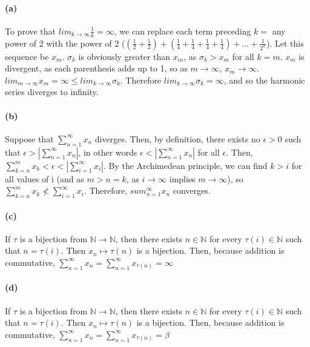 \documentclass[10pt,letter]{article}
\begin{document}
\paragraph{(a)} 
To prove that $lim_{k\rightarrow\infty}\frac{1}{k} = \infty$, we can replace each term preceding $k =$ any power of 2 with the power of 2 ($(\frac{1}{2} + \frac{1}{2}) + (\frac{1}{4} + \frac{1}{4} + \frac{1}{4} + \frac{1}{4}) + ... + \frac{1}{2^n}$). Let this sequence be $x_m$. $\sigma_k$ is obviously greater than $x_m$, as $\sigma_k > x_m$ for all $k = m$. $x_m$ is divergent, as each parenthesis adds up to 1, so as $m \rightarrow \infty$, $x_m \rightarrow \infty$. $lim_{m\rightarrow\infty}x_m = \infty \leq lim_{k\rightarrow\infty}\sigma_k$. Therefore $lim_{k\rightarrow\infty}\sigma_k = \infty$, and so the harmonic series diverges to infinity. 

\paragraph{(b)} Suppose that $\sum_{n=1}^\infty x_n$ diverges. Then, by definition, there exists no $\epsilon > 0$ such that $\epsilon > |\sum_{n=1}^\infty x_n|$, in other words $\epsilon < |\sum_{n=1}^\infty x_n|$ for all $\epsilon$. Then, $\sum_{k=n}^m x_k < \epsilon < |\sum_{i=1}^\infty x_i|$. By the Archimedean principle, we can find $k > i$ for all values of i (and as $m > n = k$, as $i \rightarrow\infty$ implies $m \rightarrow \infty$), so $\sum_{k=n}^m x_k \nless \sum_{i=1}^\infty x_i$. Therefore, $sum_{n=1}^\infty x_n$ converges. 

\paragraph{(c)} If $\tau$ is a bijection from $\mathbb{N} \rightarrow \mathbb{N}$, then there exists $n \in \mathbb{N}$ for every $\tau(i) \in \mathbb{N}$ such that $n = \tau(i)$. Then $x_n \mapsto \tau(n)$ is a bijection. Then, because addition is commutative, $\sum_{n=1}^\infty x_n = \sum_{n=1}^\infty x_{\tau(n)} = \infty$

\paragraph{(d)}  If $\tau$ is a bijection from $\mathbb{N} \rightarrow \mathbb{N}$, then there exists $n \in \mathbb{N}$ for every $\tau(i) \in \mathbb{N}$ such that $n = \tau(i)$. Then $x_n \mapsto \tau(n)$ is a bijection. Then, because addition is commutative, $\sum_{n=1}^\infty x_n = \sum_{n=1}^\infty x_{\tau(n)} = \beta$
\end{document}
